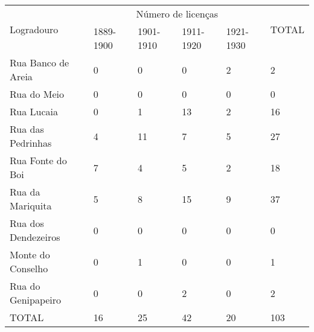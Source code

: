 \begin{table}[!htp]
{
\begin{tiny}
\begin{tabular}{llllll}
\toprule
\multirow{2}{*}{Logradouro}	& \multicolumn{4}{c}{Número de licenças}	& \multirow{2}{*}{TOTAL}\\
\cline{2-5}
	&1889-1900	&1901-1910	&1911-1920	&1921-1930	& \\
\midrule
\midrule
Rua Banco de Areia	&0	&0	&0	&2	&2\\
Rua do Meio	&0	&0	&0	&0	&0\\
Rua Lucaia	&0	&1	&13	&2	&16\\
Rua das Pedrinhas	&4	&11	&7	&5	&27\\
Rua Fonte do Boi	&7	&4	&5	&2	&18\\
Rua da Mariquita	&5	&8	&15	&9	&37\\
Rua dos Dendezeiros	&0	&0	&0	&0	&0\\
Monte do Conselho	&0	&1	&0	&0	&1\\
Rua do Genipapeiro	&0	&0	&2	&0	&2\\
\midrule
TOTAL	&16	&25	&42	&20	&103\\
\bottomrule
\end{tabular} 
\end{tiny}
}
{}
\end{table}
